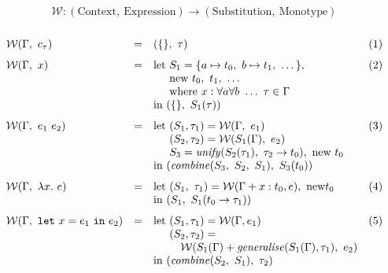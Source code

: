 \documentclass[a4paper,fleqn,oneside,12pt]{report}
\begin{document}
$$
\mathcal{W}: (\mathrm{Context},\ \mathrm{Expression}) \rightarrow (\mathrm{Substitution},\ \mathrm{Monotype})
$$$$
\begin{array}{lclc}
  \\
    \mathcal{W}(\Gamma,\ c_{\tau})                                & = & (\{\},\ \tau) & (1)\vspace{0.25cm}\\
    \mathcal{W}(\Gamma,\ x)                                       & = & \textrm{let}\ S_1 = \{ a \mapsto t_0,\ b \mapsto t_1,\ \dots \},& (2)\\
                                                                  &   & \phantom{\textrm{let}}\ \textrm{new}\ t_0,\ t_1,\ \dots &\\
                                                                  &   & \phantom{\textrm{let}}\ \textrm{where}\ x : \forall a \forall b\ \dots\ \tau \in \Gamma &\\
                                                                  &   & \textrm{in}\ (\{\},\ S_1(\tau)) &\vspace{0.25cm}\\
    \mathcal{W}(\Gamma,\ e_1\ e_2)                                & = & \textrm{let}\ (S_1, \tau_1) = \mathcal{W}(\Gamma,\ e_1) & (3)\\
                                                                  &   & \phantom{\textrm{let}}\ (S_2, \tau_2) = \mathcal{W}(S_1(\Gamma),\ e_2) &\\
                                                                  &   & \phantom{\textrm{let}}\ S_3 = \mathit{unify}(S_2(\tau_1),\ \tau_2 \rightarrow t_0),\ \textrm{new}\ t_0 &\\
                                                                  &   & \textrm{in}\ (\mathit{combine}(S_3,\ S_2,\ S_1),\ S_3(t_0)) &\vspace{0.25cm}\\
    \mathcal{W}(\Gamma,\ \lambda x.\ e  )                         & = & \textrm{let}\ (S_1,\ \tau_1) = \mathcal{W}(\Gamma + x : t_0, e),\ \textrm{new} t_0 & (4)\\
                                                                  &   & \textrm{in}\ (S_1,\ S_1(t_0 \rightarrow \tau_1)) &\vspace{0.25cm}\\
    \mathcal{W}(\Gamma,\ \mathtt{let}\ x = e_1\ \mathtt{in}\ e_2) & = & \textrm{let}\ (S_1, \tau_1) = \mathcal{W}(\Gamma, e_1) & (5)\\
                                                                  &   & \phantom{\textrm{let}}\ (S_2, \tau_2) = &\\
                                                                  &   & \phantom{\textrm{let}}\ \quad \mathcal{W}(S_1(\Gamma) + \mathit{generalise}(S_1(\Gamma), \tau_1),\ e_2) &\\
                                                                  &   & \textrm{in}\ (\mathit{combine}(S_2,\ S_1),\ \tau_2) &\\
  \\
\end{array}
$$
\end{document}
